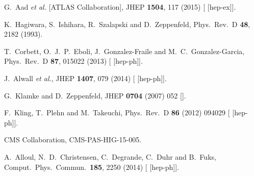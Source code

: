  G.~Aad {\it et al.} [ATLAS Collaboration],
  JHEP {\bf 1504}, 117 (2015)
  [ [hep-ex]].

  K.~Hagiwara, S.~Ishihara, R.~Szalapski and D.~Zeppenfeld,
  Phys.\ Rev.\ D {\bf 48}, 2182 (1993).

  T.~Corbett, O.~J.~P.~Eboli, J.~Gonzalez-Fraile and M.~C.~Gonzalez-Garcia,
  Phys.\ Rev.\ D {\bf 87}, 015022 (2013)
  [ [hep-ph]].

  J.~Alwall {\it et al.},
  JHEP {\bf 1407}, 079 (2014)
  [ [hep-ph]].

  G.~Klamke and D.~Zeppenfeld,
  JHEP {\bf 0704} (2007) 052
  [].

  F.~Kling, T.~Plehn and M.~Takeuchi,
  Phys.\ Rev.\ D {\bf 86} (2012) 094029
  [ [hep-ph]].

  CMS Collaboration,
  CMS-PAS-HIG-15-005.

  A.~Alloul, N.~D.~Christensen, C.~Degrande, C.~Duhr and B.~Fuks,
  Comput.\ Phys.\ Commun.\  {\bf 185}, 2250 (2014)
  [ [hep-ph]].

